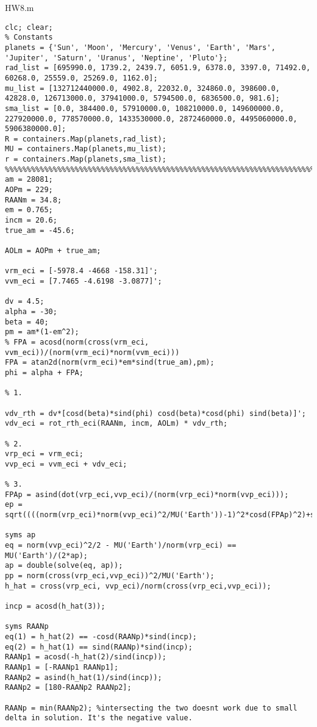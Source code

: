 HW8.m
\begin{lstlisting}[frame=lines,style=Matlab-editor,basicstyle = \mlttfamily]
clc; clear;
% Constants
planets = {'Sun', 'Moon', 'Mercury', 'Venus', 'Earth', 'Mars', 'Jupiter', 'Saturn', 'Uranus', 'Neptine', 'Pluto'};
rad_list = [695990.0, 1739.2, 2439.7, 6051.9, 6378.0, 3397.0, 71492.0, 60268.0, 25559.0, 25269.0, 1162.0];
mu_list = [132712440000.0, 4902.8, 22032.0, 324860.0, 398600.0, 42828.0, 126713000.0, 37941000.0, 5794500.0, 6836500.0, 981.6];
sma_list = [0.0, 384400.0, 57910000.0, 108210000.0, 149600000.0, 227920000.0, 778570000.0, 1433530000.0, 2872460000.0, 4495060000.0, 5906380000.0];
R = containers.Map(planets,rad_list);
MU = containers.Map(planets,mu_list);
r = containers.Map(planets,sma_list);
%%%%%%%%%%%%%%%%%%%%%%%%%%%%%%%%%%%%%%%%%%%%%%%%%%%%%%%%%%%%%%%%%%%%%%%%
am = 28081;
AOPm = 229;
RAANm = 34.8;
em = 0.765;
incm = 20.6;
true_am = -45.6;

AOLm = AOPm + true_am;

vrm_eci = [-5978.4 -4668 -158.31]';
vvm_eci = [7.7465 -4.6198 -3.0877]';

dv = 4.5;
alpha = -30;
beta = 40;
pm = am*(1-em^2);
% FPA = acosd(norm(cross(vrm_eci, vvm_eci))/(norm(vrm_eci)*norm(vvm_eci)))
FPA = atan2d(norm(vrm_eci)*em*sind(true_am),pm);
phi = alpha + FPA;

% 1.

vdv_rth = dv*[cosd(beta)*sind(phi) cosd(beta)*cosd(phi) sind(beta)]';
vdv_eci = rot_rth_eci(RAANm, incm, AOLm) * vdv_rth;

% 2.
vrp_eci = vrm_eci;
vvp_eci = vvm_eci + vdv_eci;

% 3.
FPAp = asind(dot(vrp_eci,vvp_eci)/(norm(vrp_eci)*norm(vvp_eci)));
ep = sqrt((((norm(vrp_eci)*norm(vvp_eci)^2/MU('Earth'))-1)^2*cosd(FPAp)^2)+sind(FPAp)^2);

syms ap
eq = norm(vvp_eci)^2/2 - MU('Earth')/norm(vrp_eci) == MU('Earth')/(2*ap);
ap = double(solve(eq, ap));
pp = norm(cross(vrp_eci,vvp_eci))^2/MU('Earth');
h_hat = cross(vrp_eci, vvp_eci)/norm(cross(vrp_eci,vvp_eci));

incp = acosd(h_hat(3));

syms RAANp
eq(1) = h_hat(2) == -cosd(RAANp)*sind(incp);
eq(2) = h_hat(1) == sind(RAANp)*sind(incp);
RAANp1 = acosd(-h_hat(2)/sind(incp));
RAANp1 = [-RAANp1 RAANp1];
RAANp2 = asind(h_hat(1)/sind(incp));
RAANp2 = [180-RAANp2 RAANp2];

RAANp = min(RAANp2); %intersecting the two doesnt work due to small delta in solution. It's the negative value.


\end{lstlisting}
